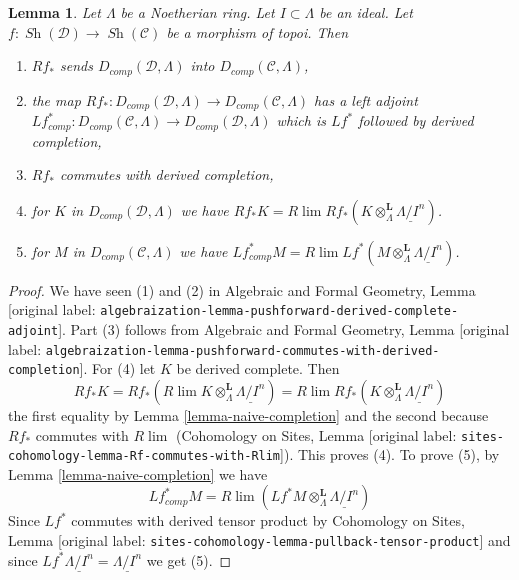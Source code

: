 \documentclass[10pt,a4paper]{article}
\theoremstyle{plain}
\newtheorem{lemma}[subsection]{Lemma}
\theoremstyle{definition}
\theoremstyle{remark}
\numberwithin{equation}{subsection}
\def\lim{\mathop{\mathrm{lim}}\nolimits}
\def\Sh{\mathop{\mathit{Sh}}\nolimits}
\begin{document}
\begin{lemma}
\label{lemma-pushforward-Noetherian-case}
Let $\Lambda$ be a Noetherian ring. Let $I \subset \Lambda$ be an ideal.
Let $f : \Sh(\mathcal{D}) \to \Sh(\mathcal{C})$ be a morphism of topoi.
Then
\begin{enumerate}
\item $Rf_*$ sends $D_{comp}(\mathcal{D}, \Lambda)$
into $D_{comp}(\mathcal{C}, \Lambda)$,
\item the map $Rf_* : D_{comp}(\mathcal{D}, \Lambda) \to
D_{comp}(\mathcal{C}, \Lambda)$ has a left adjoint
$Lf_{comp}^* : D_{comp}(\mathcal{C}, \Lambda) \to
D_{comp}(\mathcal{D}, \Lambda)$ which is $Lf^*$ followed by
derived completion,
\item $Rf_*$ commutes with derived completion,
\item for $K$ in $D_{comp}(\mathcal{D}, \Lambda)$ we have
$Rf_*K = R\lim Rf_*(K \otimes^\mathbf{L}_\Lambda \underline{\Lambda/I^n})$.
\item for $M$ in $D_{comp}(\mathcal{C}, \Lambda)$ we have
$Lf^*_{comp}M =
R\lim Lf^*(M \otimes^\mathbf{L}_\Lambda \underline{\Lambda/I^n})$.
\end{enumerate}
\end{lemma}

\begin{proof}
We have seen (1) and (2) in
Algebraic and Formal Geometry, Lemma
\textnormal{[original label: \nolinkurl{algebraization-lemma-pushforward-derived-complete-adjoint}]}.
Part (3) follows from
Algebraic and Formal Geometry, Lemma
\textnormal{[original label: \nolinkurl{algebraization-lemma-pushforward-commutes-with-derived-completion}]}.
For (4) let $K$ be derived complete. Then
$$
Rf_*K = Rf_*( R\lim K \otimes^\mathbf{L}_\Lambda \underline{\Lambda/I^n}) =
R\lim Rf_*(K \otimes^\mathbf{L}_\Lambda \underline{\Lambda/I^n})
$$
the first equality by Lemma \ref{lemma-naive-completion}
and the second because $Rf_*$ commutes with $R\lim$
(Cohomology on Sites, Lemma
\textnormal{[original label: \nolinkurl{sites-cohomology-lemma-Rf-commutes-with-Rlim}]}). This proves (4).
To prove (5), by Lemma \ref{lemma-naive-completion} we have
$$
Lf_{comp}^*M =
R\lim ( Lf^*M \otimes_\Lambda^\mathbf{L} \underline{\Lambda/I^n})
$$
Since $Lf^*$ commutes with derived tensor product by
Cohomology on Sites, Lemma \textnormal{[original label: \nolinkurl{sites-cohomology-lemma-pullback-tensor-product}]}
and since $Lf^*\underline{\Lambda/I^n} = \underline{\Lambda/I^n}$
we get (5).
\end{proof}
\end{document}
